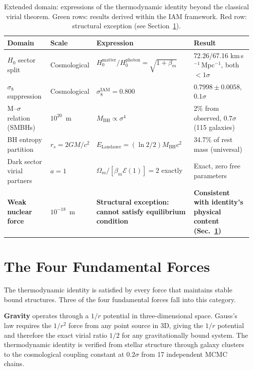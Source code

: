 \documentclass[12pt,a4paper]{article}
\begin{document}
\begin{table}[H]
\centering
\small
\caption{Extended domain: expressions of the thermodynamic identity beyond
the classical virial theorem. \colorbox{newresult}{Green rows}: results
derived within the IAM framework. \colorbox{weakrow}{Red row}: structural
exception (see Section~\ref{sec:forces}).}
\label{tab:extended}
\begin{tabular}{p{3.8cm} p{2.5cm} p{4.5cm} p{3.8cm}}
\toprule
\textbf{Domain} & \textbf{Scale} &
\textbf{Expression} & \textbf{Result} \\
\midrule
$H_0$ sector split
& Cosmological
& $H_0^\mathrm{matter}/H_0^\mathrm{photon} = \sqrt{1+\beta_m}$
& 72.26/67.16 km\,s$^{-1}$\,Mpc$^{-1}$, both $<1\sigma$ \citep{IAM_obs} \\[3pt]
$\sigma_8$ suppression
& Cosmological
& $\sigma_8^\mathrm{IAM} = 0.800$
& $0.7998 \pm 0.0058$, $0.1\sigma$ \citep{IAM_obs} \\[3pt]
M--$\sigma$ relation (SMBHs)
& $10^{20}$~m
& $M_\mathrm{BH} \propto \sigma^4$
& 2\% from observed, $0.7\sigma$ (115 galaxies) \citep{IAM_msigma} \\[3pt]
BH entropy partition
& $r_s = 2GM/c^2$
& $E_\mathrm{Landauer} = (\ln 2/2)M_\mathrm{BH}c^2$
& 34.7\% of rest mass (universal) \citep{IAM_BH} \\[3pt]
\rowcolor{newresult}
Dark sector virial partners
& $a = 1$
& $\Omega_m/[\beta_m\mathcal{E}(1)] = 2$ exactly
& Exact, zero free parameters \citep{IAM_virial_dm} \\[3pt]
\rowcolor{weakrow}
\textbf{Weak nuclear force}
& $10^{-18}$~m
& \textbf{Structural exception: cannot satisfy equilibrium condition}
& \textbf{Consistent with identity's physical content (Sec.~\ref{sec:forces})} \\
\bottomrule
\end{tabular}
\end{table}

\section{The Four Fundamental Forces}
\label{sec:forces}

The thermodynamic identity is satisfied by every force that maintains
stable bound structures. Three of the four fundamental forces fall into
this category.

\textbf{Gravity} operates through a $1/r$ potential in three-dimensional
space. Gauss's law requires the $1/r^2$ force from any point source in 3D,
giving the $1/r$ potential and therefore the exact virial ratio $1/2$ for
any gravitationally bound system. The thermodynamic identity is verified
from stellar structure through galaxy clusters to the cosmological coupling
constant at $0.2\sigma$ from 17 independent MCMC chains.
\end{document}
